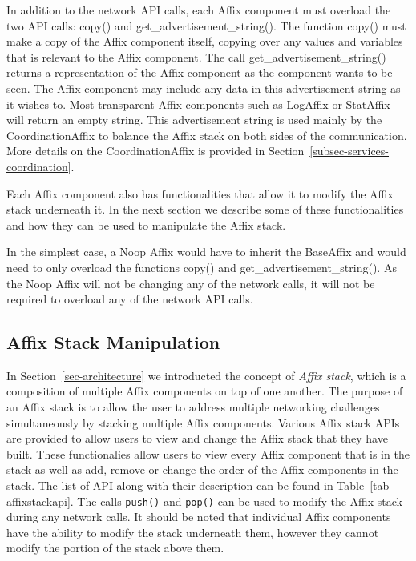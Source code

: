 In addition to the network API calls, each Affix component must overload the
two API calls: copy() and get\_advertisement\_string(). The function
copy() must make a copy of the Affix component itself, copying over any values
and variables that is relevant to the Affix component. The call get\_advertisement\_string()
returns a representation of the Affix component as the component wants to be seen. The Affix
component may include any data in this advertisement string as it wishes to. Most 
transparent Affix components such as LogAffix or StatAffix will return an empty string.
This advertisement string is used mainly by the CoordinationAffix to balance 
the Affix stack on both sides of the communication. More details on the CoordinationAffix
is provided in Section~\ref{subsec-services-coordination}.

Each Affix component also has functionalities that allow it to modify the Affix
stack underneath it. In the next section we describe some of these functionalities
and how they can be used to manipulate the Affix stack.

In the simplest case, a Noop Affix would have to inherit the BaseAffix and would
need to only overload the functions copy() and get\_advertisement\_string(). As
the Noop Affix will not be changing any of the network calls, it will not be 
required to overload any of the network API calls.


\subsection{Affix Stack Manipulation}
\label{subsec-affixstack-manipulation}

In Section~\ref{sec-architecture} we introducted the concept of \textit{Affix stack},
which is a composition of multiple Affix components on top of one another. The 
purpose of an Affix stack is to allow the user to address multiple networking 
challenges simultaneously by stacking multiple Affix components. Various Affix stack
APIs are provided to allow users to view and change the Affix stack that they have
built. These functionalies allow users to view every Affix component that is in the
stack as well as add, remove or change the order of the Affix components in the
stack. The list of API along with their description can be found in 
Table~\ref{tab-affixstackapi}. The calls \texttt{push()} and \texttt{pop()} can 
be used to modify the Affix stack during any network calls. It should be noted 
that individual Affix components have the ability to modify the stack underneath
them, however they cannot modify the portion of the stack above them.

